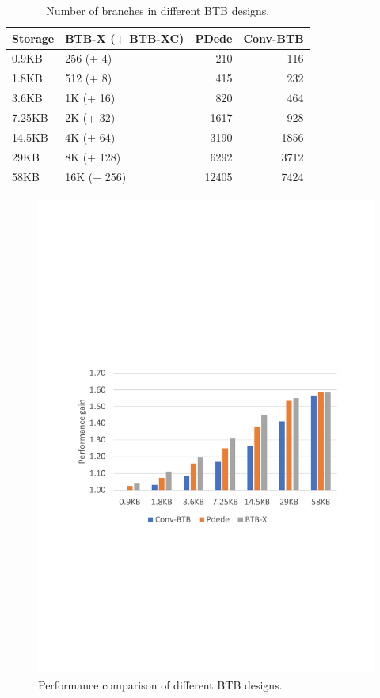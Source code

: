 \begin{small}
\begin{table}
  \centering
  \caption{Number of branches in different BTB designs.}
  \label{pact:table:storageComp}
  \begin{tabular}{llrr} \hline
    \textbf{Storage} & \textbf{BTB-X (+ BTB-XC)} & \textbf{PDede}
    & \textbf{Conv-BTB} \\\hline
    0.9KB & 256 (+ 4) & 210 & 116\\\hline
    1.8KB & 512 (+ 8) & 415 & 232\\\hline
    3.6KB & 1K (+ 16) & 820 & 464\\\hline
    7.25KB & 2K (+ 32) & 1617 & 928\\\hline
    14.5KB & 4K (+ 64) & 3190 & 1856\\\hline
    29KB & 8K (+ 128) & 6292 & 3712\\\hline
    58KB & 16K (+ 256) & 12405 & 7424\\\hline
  \end{tabular}
  \vspace{-0.1in}
\end{table}
\end{small}

\begin{figure}
    \centering
    \includegraphics[width=\textwidth, trim=70 265 70 330, clip]{figures/ISOStorage-Server.pdf}
    \vspace{-0.1in}
    \caption{Performance comparison of different BTB designs.}
    \vspace{-0.1in}
    \label{pact:fig:perf}
\end{figure}